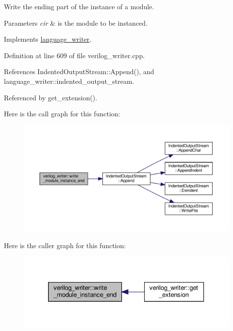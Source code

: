 Write the ending part of the instance of a module. 


\begin{DoxyParams}{Parameters}
{\em cir} & is the module to be instanced. \\
\hline
\end{DoxyParams}


Implements \hyperlink{classlanguage__writer_a58bc0c17545d1fc96385a5fbffbe62b2}{language\+\_\+writer}.



Definition at line 609 of file verilog\+\_\+writer.\+cpp.



References Indented\+Output\+Stream\+::\+Append(), and language\+\_\+writer\+::indented\+\_\+output\+\_\+stream.



Referenced by get\+\_\+extension().

Here is the call graph for this function\+:
\nopagebreak
\begin{figure}[H]
\begin{center}
\leavevmode
\includegraphics[width=350pt]{d8/dba/classverilog__writer_ac10a9da13d7ad6c60d862998383a3695_cgraph}
\end{center}
\end{figure}
Here is the caller graph for this function\+:
\nopagebreak
\begin{figure}[H]
\begin{center}
\leavevmode
\includegraphics[width=326pt]{d8/dba/classverilog__writer_ac10a9da13d7ad6c60d862998383a3695_icgraph}
\end{center}
\end{figure}
\mbox{\label{classverilog__writer_a7384e2a4f2485bcadb61747e2371f64e}} 
